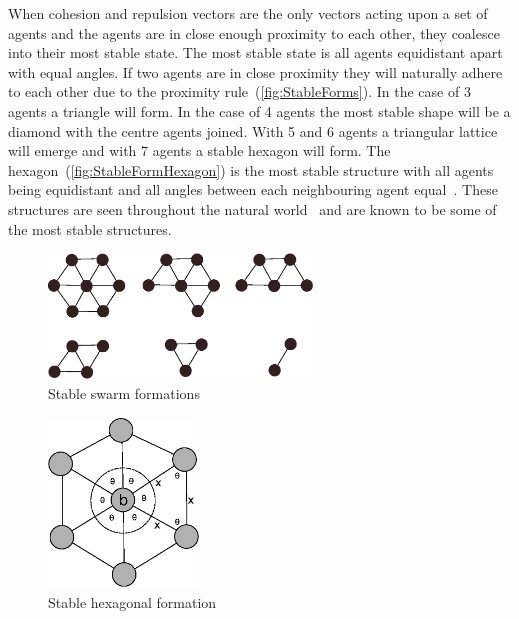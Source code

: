When cohesion and repulsion vectors are the only vectors acting upon a set of agents and the agents are in close enough proximity to each other, they coalesce into their most stable state. The most stable state is all agents equidistant apart with equal angles. If two agents are in close proximity they will naturally adhere to each other due to the proximity rule~(\autoref{fig:StableForms}). In the case of 3 agents a triangle will form. In the case of 4 agents the most stable shape will be a diamond with the centre agents joined. With 5 and 6 agents a triangular lattice will emerge and with 7 agents a stable hexagon will form. The hexagon~(\autoref{fig:StableFormHexagon}) is the most stable structure with all agents being equidistant and all angles between each neighbouring agent equal~\cite{BAF:06, GP:05}. These structures are seen throughout the natural world~\cite{RAZ:13} and are known to be some of the most stable structures.

\begin{figure}[H]
\begin{center}
\includegraphics[width=7cm]{CHAPTER-2/figures/StableForms}
\end{center}
\caption{Stable swarm formations}\label{fig:StableForms}
\end{figure}

\begin{figure}[H]
\begin{center}
\includegraphics[width=4cm]{CHAPTER-2/figures/Hexagon}
\end{center}
\caption{Stable hexagonal formation}\label{fig:StableFormHexagon}
\end{figure}

